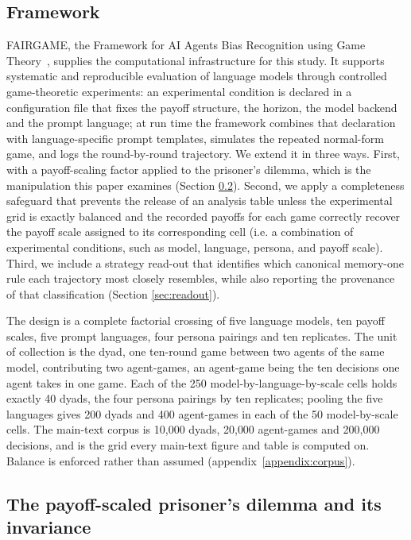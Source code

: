 \documentclass[11pt,a4paper]{article}
\begin{document}
\subsection{Framework}\label{sec:background}

FAIRGAME, the Framework for AI Agents Bias Recognition using Game
Theory~\cite{buscemi2025fairgame}, supplies the computational infrastructure
for this study. It supports systematic and reproducible evaluation of language
models through controlled game-theoretic experiments: an experimental condition
is declared in a configuration file that fixes the payoff structure, the
horizon, the model backend and the prompt language; at run time the framework
combines that declaration with language-specific prompt templates, simulates
the repeated normal-form game, and logs the round-by-round trajectory. We
extend it in three ways. First, with a payoff-scaling factor applied to the
prisoner's dilemma, which is the manipulation this paper examines 
(Section \ref{sec:gameImportance}). Second,  we apply a completeness safeguard that prevents the release of an analysis table unless the experimental grid is exactly balanced and the recorded payoffs for each game correctly recover the payoff scale assigned to its corresponding cell (i.e. a  combination of experimental conditions, such as model, language, persona, and payoff scale). Third, we include a strategy read-out that identifies which canonical memory-one rule each trajectory most closely resembles, while also reporting the provenance of that classification (Section \ref{sec:readout}).

The design is a complete factorial crossing of five language models, ten payoff
scales, five prompt languages, four persona pairings and ten replicates. The
unit of collection is the dyad, one ten-round game between two agents of the
same model, contributing two agent-games, an agent-game being the ten decisions
one agent takes in one game. Each of the 250 model-by-language-by-scale cells
holds exactly 40 dyads, the four persona pairings by ten replicates; pooling
the five languages gives 200 dyads and 400 agent-games in each of the 50
model-by-scale cells. The main-text corpus is 10{,}000 dyads, 20{,}000
agent-games and 200{,}000 decisions, and is the grid every main-text figure and
table is computed on. Balance is enforced rather than assumed
(appendix~\ref{appendix:corpus}).

\subsection{The payoff-scaled prisoner's dilemma and its invariance}\label{sec:gameImportance}
\end{document}
